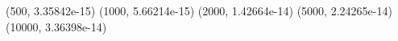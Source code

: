 (500, 3.35842e-15) (1000, 5.66214e-15) (2000, 1.42664e-14) (5000, 2.24265e-14) (10000, 3.36398e-14) 